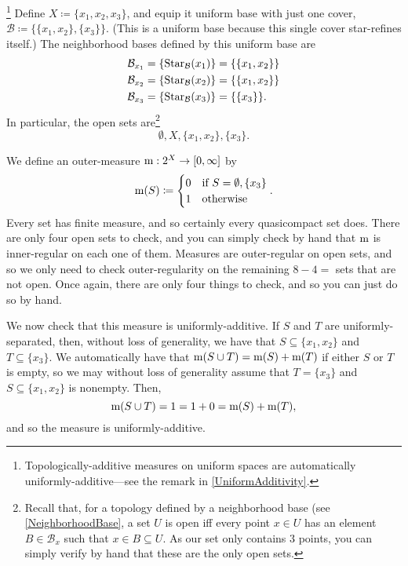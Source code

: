 \begin{exm}\footnote{Topologically-additive measures on uniform spaces are automatically uniformly-additive---see the remark in \cref{UniformAdditivity}.}\label{exm5.1.43}
Define $X\coloneqq \{ x_1,x_2,x_3\}$, and equip it uniform base with just one cover, $\mathcal{B}\coloneqq \{ \{ x_1,x_2\} ,\{ x_3\} \}$.  (This is a uniform base because this single cover star-refines itself.)  The neighborhood bases defined by this uniform base are
\begin{equation}
\begin{split}
\mathcal{B}_{x_1} & =\{ \operatorname{Star} _{\mathcal{B}}(x_1)\} =\{ \{ x_1,x_2\} \} \\
\mathcal{B}_{x_2} & =\{ \operatorname{Star} _{\mathcal{B}}(x_2)\} =\{ \{ x_1,x_2\} \} \\
\mathcal{B}_{x_3} & =\{ \operatorname{Star} _{\mathcal{B}}(x_3)\} =\{ \{ x_3\} \} .
\end{split}
\end{equation}
In particular, the open sets are\footnote{Recall that, for a topology defined by a neighborhood base (see \cref{NeighborhoodBase}, a set $U$ is open iff every point $x\in U$ has an element $B\in \mathcal{B}_x$ such that $x\in B\subseteq U$.  As our set only contains $3$ points, you can simply verify by hand that these are the only open sets.}
\begin{equation}
\emptyset ,X,\{ x_1,x_2\} ,\{ x_3\} .
\end{equation}

We define an outer-measure $\mathrm{m} :2^X\rightarrow [0,\infty ]$ by
\begin{equation}
\mathrm{m} (S)\coloneqq \begin{cases}0 & \text{if }S=\emptyset ,\{ x_3\} \\ 1 & \text{otherwise}\end{cases}.
\end{equation}
Every set has finite measure, and so certainly every quasicompact set does.  There are only four open sets to check, and you can simply check by hand that $\mathrm{m}$ is inner-regular on each one of them.  Measures are outer-regular on open sets, and so we only need to check outer-regularity on the remaining $8-4=$ sets that are not open.  Once again, there are only four things to check, and so you can just do so by hand.

We now check that this measure is uniformly-additive.  If $S$ and $T$ are uniformly-separated, then, without loss of generality, we have that $S\subseteq \{ x_1,x_2\}$ and $T\subseteq \{ x_3\}$.  We automatically have that $\mathrm{m} (S\cup T)=\mathrm{m} (S)+\mathrm{m} (T)$ if either $S$ or $T$ is empty, so we may without loss of generality assume that $T=\{ x_3\}$ and $S\subseteq \{ x_1,x_2\}$ is nonempty.  Then,
\begin{equation}
\mathrm{m} (S\cup T)=1=1+0=\mathrm{m} (S)+\mathrm{m} (T),
\end{equation}
and so the measure is uniformly-additive.


\end{exm}

